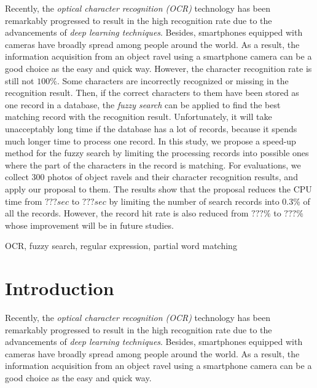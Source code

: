 \documentclass[technicalreport]{ieicej}
\begin{document}

\begin{eabstract}
    Recently, the {\em optical character recognition (OCR)} technology has been remarkably progressed to result in the high recognition rate due to the advancements of {\em deep learning techniques}. Besides, smartphones equipped with cameras have broadly spread among people around the world. As a result, the information acquisition from an object ravel using a smartphone camera can be a good choice as the easy and quick way.
    However, the character recognition rate is still not $100\%$. Some characters are incorrectly recognized or missing in the recognition result. Then, if the correct characters to them have been stored as one record in a database, the {\em fuzzy search} can be applied to find the best matching record with the recognition result. Unfortunately, it will take unacceptably long time if the database has a lot of records, because it spends much longer time to process one record. 
    In this study, we propose a speed-up method for the fuzzy search by limiting the processing records into possible ones where the part of the characters in the record is matching. 
    For evaluations, we collect 300 photos of object ravels and their character recognition results, and apply our proposal to them. The results show that the proposal reduces the CPU time from $???sec$ to $???sec$ by limiting the number of search records into 0.3\% of all the records. However, the record hit rate is also reduced from $???\%$ to $???\%$ whose improvement will be in future studies.
    
\end{eabstract}
\begin{ekeyword}
OCR, fuzzy search, regular expression, partial word matching
\end{ekeyword}
\maketitle

\section{Introduction}
    Recently, the {\em optical character recognition (OCR)} technology has been remarkably progressed to result in the high recognition rate due to the advancements of {\em deep learning techniques}. Besides, smartphones equipped with cameras have broadly spread among people around the world. As a result, the information acquisition from an object ravel using a smartphone camera can be a good choice as the easy and quick way.
\end{document}
